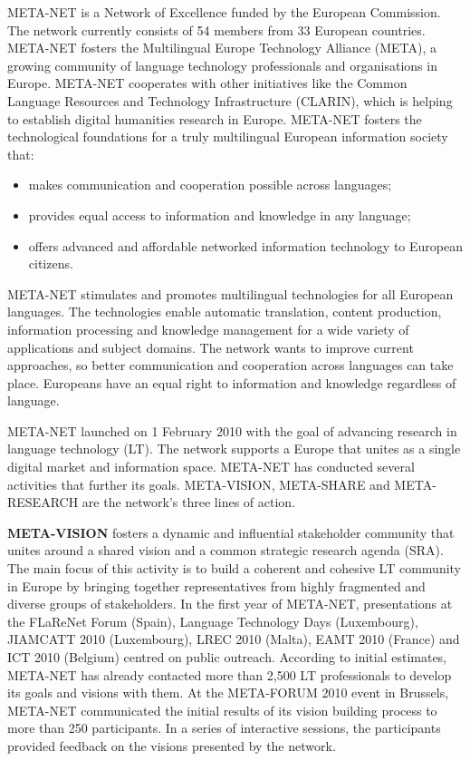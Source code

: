 \begin{multicols}{2}
META-NET is a Network of Excellence funded by the European Commission. The network currently consists of 54 members from 33 European countries\cite{rehm2011}. META-NET fosters the Multilingual Europe Technology Alliance (META), a growing community of language technology professionals and organisations in Europe. META-NET cooperates with other initiatives like the Common Language Resources and Technology Infrastructure (CLARIN), which is helping to establish digital humanities research in Europe. META-NET fosters the technological foundations for a truly multilingual European information society that:

\begin{itemize}
\item makes communication and cooperation possible across languages;
\item provides equal access to information and knowledge in any language;
\item offers advanced and affordable networked information technology to European citizens.
\end{itemize}

META-NET stimulates and promotes multilingual technologies for all European languages. The technologies enable automatic translation, content production, information processing and knowledge management for a wide variety of applications and subject domains. The network wants to improve current approaches, so better communication and cooperation across languages can take place. Europeans have an equal right to information and knowledge regardless of language.

META-NET launched on 1 February 2010 with the goal of advancing research in language technology (LT). The network supports a Europe that unites as a single digital market and information space. META-NET has conducted several activities that further its goals. META-VISION, META-SHARE and META-RESEARCH are the network’s three lines of action.

\textbf{META-VISION} fosters a dynamic and influential stakeholder community that unites around a shared vision and a common strategic research agenda (SRA). The main focus of this activity is to build a coherent and cohesive LT community in Europe by bringing together representatives from highly fragmented and diverse groups of stakeholders. In the first year of META-NET, presentations at the FLaReNet Forum (Spain), Language Technology Days (Luxembourg), JIAMCATT 2010 (Luxembourg), LREC 2010 (Malta), EAMT 2010 (France) and ICT 2010 (Belgium) centred on public outreach. According to initial estimates, META-NET has already contacted more than 2,500 LT professionals to develop its goals and visions with them. At the META-FORUM 2010 event in Brussels, META-NET communicated the initial results of its vision building process to more than 250 participants. In a series of interactive sessions, the participants provided feedback on the visions presented by the network. 


\end{multicols}
